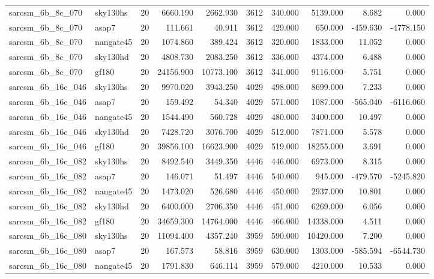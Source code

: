 \documentclass{article}
\begin{document}
\begin{longtable}{llrrrrrrrr}
sarcsm\_6b\_8c\_070 & sky130hs & 20 & 6660.190 & 2662.930 & 3612 & 340.000 & 5139.000 & 8.682 & 0.000 \\
sarcsm\_6b\_8c\_070 & asap7 & 20 & 111.661 & 40.911 & 3612 & 429.000 & 650.000 & -459.630 & -4778.150 \\
sarcsm\_6b\_8c\_070 & nangate45 & 20 & 1074.860 & 389.424 & 3612 & 320.000 & 1833.000 & 11.052 & 0.000 \\
sarcsm\_6b\_8c\_070 & sky130hd & 20 & 4808.730 & 2083.250 & 3612 & 336.000 & 4374.000 & 6.488 & 0.000 \\
sarcsm\_6b\_8c\_070 & gf180 & 20 & 24156.900 & 10773.100 & 3612 & 341.000 & 9116.000 & 5.751 & 0.000 \\
sarcsm\_6b\_16c\_046 & sky130hs & 20 & 9970.020 & 3943.250 & 4029 & 498.000 & 8699.000 & 7.233 & 0.000 \\
sarcsm\_6b\_16c\_046 & asap7 & 20 & 159.492 & 54.340 & 4029 & 571.000 & 1087.000 & -565.040 & -6116.060 \\
sarcsm\_6b\_16c\_046 & nangate45 & 20 & 1544.490 & 560.728 & 4029 & 480.000 & 3400.000 & 10.497 & 0.000 \\
sarcsm\_6b\_16c\_046 & sky130hd & 20 & 7428.720 & 3076.700 & 4029 & 512.000 & 7871.000 & 5.578 & 0.000 \\
sarcsm\_6b\_16c\_046 & gf180 & 20 & 39856.100 & 16623.900 & 4029 & 519.000 & 18255.000 & 3.691 & 0.000 \\
sarcsm\_6b\_16c\_082 & sky130hs & 20 & 8492.540 & 3449.350 & 4446 & 446.000 & 6973.000 & 8.315 & 0.000 \\
sarcsm\_6b\_16c\_082 & asap7 & 20 & 146.071 & 51.497 & 4446 & 540.000 & 945.000 & -479.570 & -5245.820 \\
sarcsm\_6b\_16c\_082 & nangate45 & 20 & 1473.020 & 526.680 & 4446 & 450.000 & 2937.000 & 10.801 & 0.000 \\
sarcsm\_6b\_16c\_082 & sky130hd & 20 & 6400.000 & 2706.350 & 4446 & 451.000 & 6269.000 & 6.056 & 0.000 \\
sarcsm\_6b\_16c\_082 & gf180 & 20 & 34659.300 & 14764.000 & 4446 & 466.000 & 14338.000 & 4.511 & 0.000 \\
sarcsm\_6b\_16c\_080 & sky130hs & 20 & 11094.400 & 4357.240 & 3959 & 590.000 & 10420.000 & 7.200 & 0.000 \\
sarcsm\_6b\_16c\_080 & asap7 & 20 & 167.573 & 58.816 & 3959 & 630.000 & 1303.000 & -585.594 & -6544.730 \\
sarcsm\_6b\_16c\_080 & nangate45 & 20 & 1791.830 & 646.114 & 3959 & 579.000 & 4210.000 & 10.533 & 0.000 \\

\end{longtable}
\end{document}
